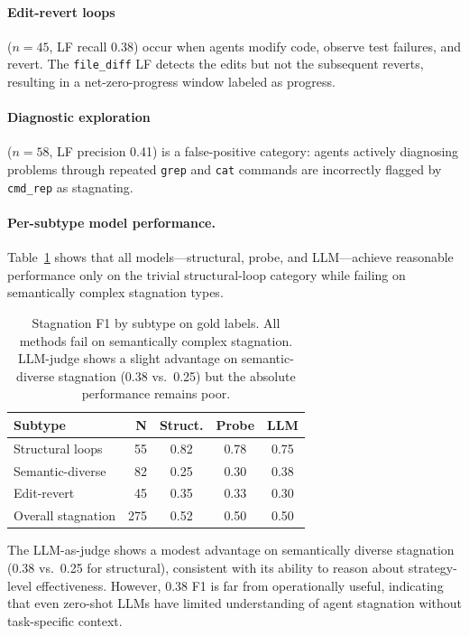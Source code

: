 \documentclass[11pt]{article}
\begin{document}
\paragraph{Edit-revert loops} ($n{=}45$, LF recall 0.38) occur when agents modify code, observe test failures, and revert. The \texttt{file\_diff} LF detects the edits but not the subsequent reverts, resulting in a net-zero-progress window labeled as progress.

\paragraph{Diagnostic exploration} ($n{=}58$, LF precision 0.41) is a false-positive category: agents actively diagnosing problems through repeated \texttt{grep} and \texttt{cat} commands are incorrectly flagged by \texttt{cmd\_rep} as stagnating.

\paragraph{Per-subtype model performance.} Table~\ref{tab:per-subtype} shows that all models---structural, probe, and LLM---achieve reasonable performance only on the trivial structural-loop category while failing on semantically complex stagnation types.

\begin{table}[t]
\centering
\small
\begin{tabular}{lrccc}
\toprule
\textbf{Subtype} & \textbf{N} & \textbf{Struct.} & \textbf{Probe} & \textbf{LLM} \\
\midrule
Structural loops    & 55 & 0.82 & 0.78 & 0.75 \\
Semantic-diverse    & 82 & 0.25 & 0.30 & 0.38 \\
Edit-revert         & 45 & 0.35 & 0.33 & 0.30 \\
Overall stagnation  & 275 & 0.52 & 0.50 & 0.50 \\
\bottomrule
\end{tabular}
\caption{Stagnation F1 by subtype on gold labels. All methods fail on semantically complex stagnation. LLM-judge shows a slight advantage on semantic-diverse stagnation (0.38 vs.\ 0.25) but the absolute performance remains poor.}
\label{tab:per-subtype}
\end{table}

The LLM-as-judge shows a modest advantage on semantically diverse stagnation (0.38 vs.\ 0.25 for structural), consistent with its ability to reason about strategy-level effectiveness. However, 0.38 F1 is far from operationally useful, indicating that even zero-shot LLMs have limited understanding of agent stagnation without task-specific context.
\end{document}
